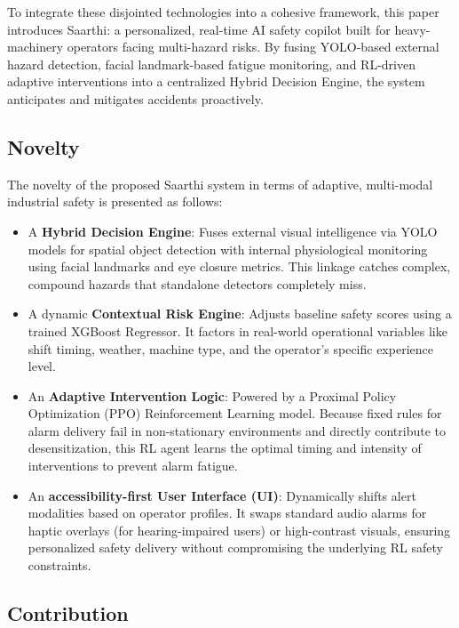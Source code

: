 To integrate these disjointed technologies into a cohesive framework, this paper introduces Saarthi: a personalized, real-time AI safety copilot built for heavy-machinery operators facing multi-hazard risks. By fusing YOLO-based external hazard detection, facial landmark-based fatigue monitoring, and RL-driven adaptive interventions into a centralized Hybrid Decision Engine, the system anticipates and mitigates accidents proactively.

\subsection{Novelty}
\label{subsec:novelty}

The novelty of the proposed Saarthi system in terms of adaptive, multi-modal industrial safety is presented as follows:

\begin{itemize}
    \item A \textbf{Hybrid Decision Engine}: Fuses external visual intelligence via YOLO models for spatial object detection with internal physiological monitoring using facial landmarks and eye closure metrics. This linkage catches complex, compound hazards that standalone detectors completely miss.
    \item A dynamic \textbf{Contextual Risk Engine}: Adjusts baseline safety scores using a trained XGBoost Regressor. It factors in real-world operational variables like shift timing, weather, machine type, and the operator's specific experience level.
    \item An \textbf{Adaptive Intervention Logic}: Powered by a Proximal Policy Optimization (PPO) Reinforcement Learning model. Because fixed rules for alarm delivery fail in non-stationary environments and directly contribute to desensitization, this RL agent learns the optimal timing and intensity of interventions to prevent alarm fatigue.
    \item An \textbf{accessibility-first User Interface (UI)}: Dynamically shifts alert modalities based on operator profiles. It swaps standard audio alarms for haptic overlays (for hearing-impaired users) or high-contrast visuals, ensuring personalized safety delivery without compromising the underlying RL safety constraints.
\end{itemize}

\subsection{Contribution}
\label{subsec:contribution}

